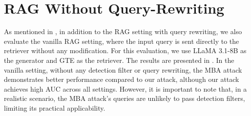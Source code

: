 \section{RAG Without Query-Rewriting}
\label{raw_rag}

As mentioned in , in addition to the RAG setting with query rewriting, we also evaluate the vanilla RAG setting, where the input query is sent directly to the retriever without any modification. For this evaluation, we use LLaMA 3.1-8B as the generator and GTE as the retriever. The results are presented in . In the vanilla setting, without any detection filter or query rewriting, the MBA attack demonstrates better performance compared to our attack, although our attack achieves high AUC across all settings. However, it is important to note that, in a realistic scenario, the MBA attack's queries are unlikely to pass detection filters, limiting its practical applicability.
